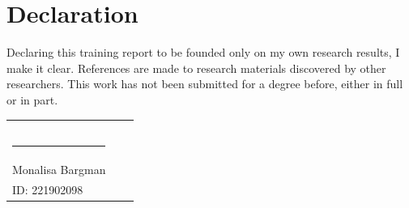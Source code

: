 \chapter*{\centering Declaration}

Declaring this training report to be founded only on my own research results, I make it clear. References are made to research materials discovered by other researchers. This work has not been submitted for a degree before, either in full or in part.


\bigskip
\bigskip
\bigskip


\begin{tabular}{p{5cm}p{5cm}p{5cm}}
\centering
     &  &   \\
     &  &   \\
     &  &   \\
 \rule{4cm}{1pt}
 \\
  Monalisa Bargman \\
  ID: 221902098

  
\end{tabular}